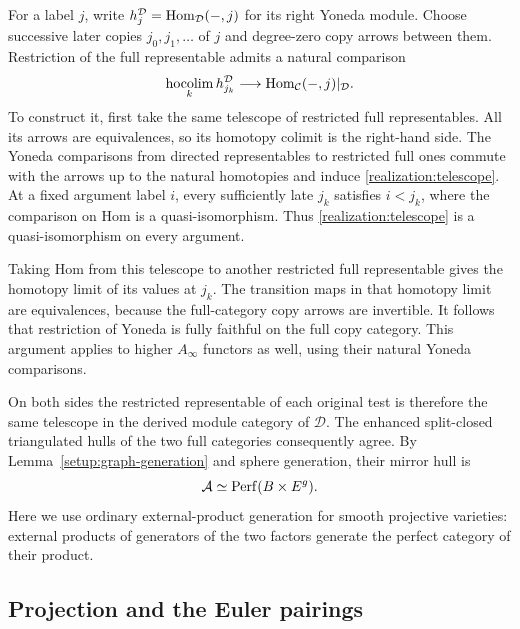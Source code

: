 For a label $j$, write $h_j^{\mathcal D}=\operatorname{Hom}_{\mathcal D}(-,j)$ for its
right Yoneda module.  Choose successive later copies
$j_0,j_1,\ldots$ of $j$ and degree-zero copy arrows between them.
Restriction of the full representable admits a natural comparison
\begin{equation}
 \mathop{\operatorname{hocolim}}_k h_{j_k}^{\mathcal D}
 \longrightarrow
 \operatorname{Hom}_{\mathcal C}(-,j)|_{\mathcal D}.
 \label{realization:telescope}
\end{equation}
To construct it, first take the same telescope of restricted full
representables.  All its arrows are equivalences, so its homotopy
colimit is the right-hand side.  The Yoneda comparisons from directed
representables to restricted full ones commute with the arrows up to
the natural homotopies and induce \eqref{realization:telescope}.
At a fixed argument label $i$, every sufficiently late $j_k$ satisfies
$i<j_k$, where the comparison on Hom is a quasi-isomorphism.
Thus \eqref{realization:telescope} is a quasi-isomorphism on every
argument.

Taking Hom from this telescope to another restricted full
representable gives the homotopy limit of its values at $j_k$.
The transition maps in that homotopy limit are equivalences, because
the full-category copy arrows are invertible.  It follows that
restriction of Yoneda is fully faithful on the full copy category.
This argument applies to higher $A_\infty$ functors as well, using
their natural Yoneda comparisons.

On both sides the restricted representable of each original test is
therefore the same telescope in the derived module category of
$\mathcal D$.  The enhanced split-closed triangulated hulls of the two
full categories consequently agree.  By
Lemma~\ref{setup:graph-generation} and sphere generation, their mirror
hull is
\begin{equation}
 \mathcal A\simeq\operatorname{Perf}(B\times E^g).
 \label{realization:mirror-hull}
\end{equation}
Here we use ordinary external-product generation for smooth projective
varieties: external products of generators of the two factors generate
the perfect category of their product.

\subsection{Projection and the Euler pairings}

